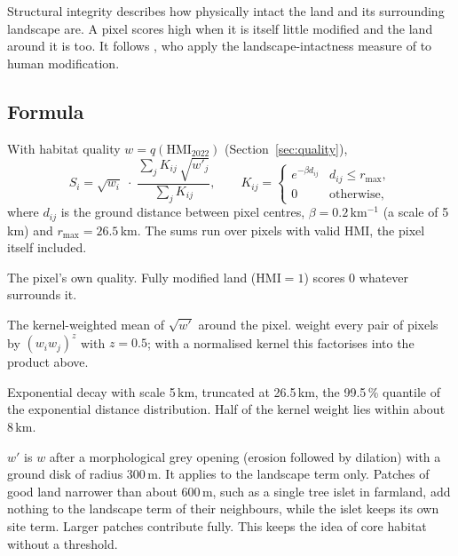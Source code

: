 \documentclass[11pt,a4paper]{article}
\newcommand{\HMI}{\mathrm{HMI}}
\begin{document}
Structural integrity describes how physically intact the land and its surrounding landscape are.
A pixel scores high when it is itself little modified and the land around it is too. It follows
\citet{hill2026}, who apply the landscape-intactness measure of \citet{beyer2020} to human
modification.

\subsection{Formula}

With habitat quality $w = q(\HMI_{2022})$ (Section~\ref{sec:quality}),
\begin{equation}
S_i = \sqrt{w_i}\;\cdot\;\frac{\sum_{j} K_{ij}\,\sqrt{w'_j}}{\sum_{j} K_{ij}}, \qquad
K_{ij} = \begin{cases} e^{-\beta d_{ij}} & d_{ij} \le r_{\max}, \\ 0 & \text{otherwise,}\end{cases}
\end{equation}
where $d_{ij}$ is the ground distance between pixel centres, $\beta = 0.2$\,km$^{-1}$ (a scale of
5\,km) and $r_{\max} = 26.5$\,km. The sums run over pixels with valid HMI, the pixel itself
included.

\begin{description}[leftmargin=1.2em]
\item[Site term $\sqrt{w_i}$.] The pixel's own quality. Fully modified land ($\HMI = 1$) scores 0
whatever surrounds it.
\item[Landscape term.] The kernel-weighted mean of $\sqrt{w'}$ around the pixel.
\citet{beyer2020} weight every pair of pixels by $(w_i w_j)^z$ with $z = 0.5$; with a
normalised kernel this factorises into the product above.
\item[Kernel.] Exponential decay with scale 5\,km, truncated at 26.5\,km, the 99.5\,\% quantile of
the exponential distance distribution. Half of the kernel weight lies within about 8\,km.
\item[Grey opening.] $w'$ is $w$ after a morphological grey opening (erosion followed by
dilation) with a ground disk of radius 300\,m. It applies to the landscape term only. Patches of
good land narrower than about 600\,m, such as a single tree islet in farmland, add nothing to the
landscape term of their neighbours, while the islet keeps its own site term. Larger patches
contribute fully. This keeps the idea of core habitat without a threshold.
\end{description}
\end{document}
